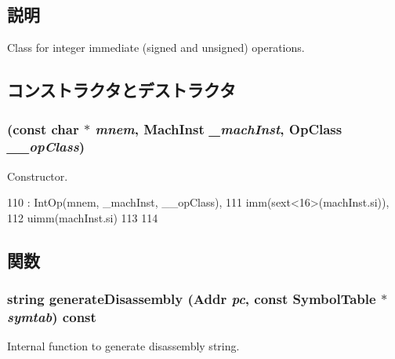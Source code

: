 \subsection{説明}
Class for integer immediate (signed and unsigned) operations. 

\subsection{コンストラクタとデストラクタ}
\hypertarget{classPowerISA_1_1IntImmOp_a75dfd9dcc9e2dad140bc74dce308a2c3}{
\subsubsection[{IntImmOp}]{ (const char $\ast$ {\em mnem}, \/  {\bf MachInst} {\em \_\-machInst}, \/  OpClass {\em \_\-\_\-opClass})}}
\label{classPowerISA_1_1IntImmOp_a75dfd9dcc9e2dad140bc74dce308a2c3}


Constructor. 


\begin{DoxyCode}
110       : IntOp(mnem, _machInst, __opClass),
111         imm(sext<16>(machInst.si)),
112         uimm(machInst.si)
113     {
114     }
\end{DoxyCode}


\subsection{関数}
\hypertarget{classPowerISA_1_1IntImmOp_a3134956ec18bb095818e06eb988f6c55}{
\subsubsection[{generateDisassembly}]{\setlength{\rightskip}{0pt plus 5cm}string generateDisassembly ({\bf Addr} {\em pc}, \/  const SymbolTable $\ast$ {\em symtab}) const}}
\label{classPowerISA_1_1IntImmOp_a3134956ec18bb095818e06eb988f6c55}
Internal function to generate disassembly string. 

